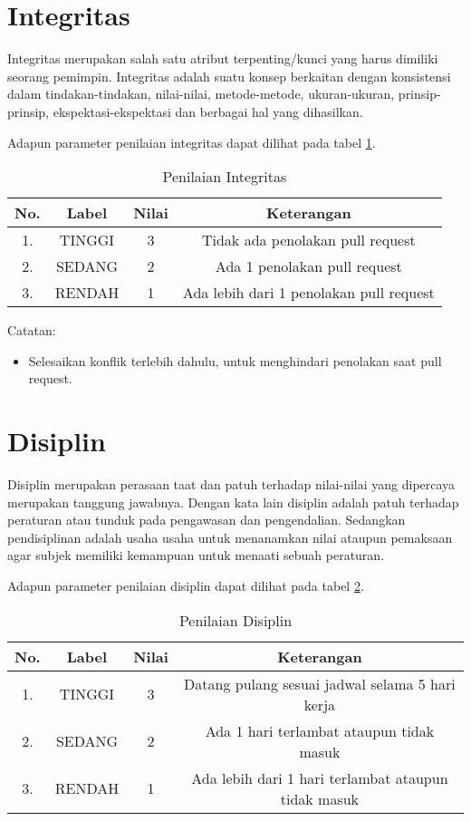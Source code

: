 \section{Integritas}
Integritas merupakan salah satu atribut terpenting/kunci yang harus dimiliki seorang pemimpin. Integritas adalah suatu konsep berkaitan dengan konsistensi dalam tindakan-tindakan, nilai-nilai, metode-metode, ukuran-ukuran, prinsip-prinsip, ekspektasi-ekspektasi dan berbagai hal yang dihasilkan.

Adapun parameter penilaian integritas dapat dilihat pada tabel \ref{tab:nilaiintegritas}.

\begin{table}[h]
\caption{Penilaian Integritas}
\centering
\begin{tabular}{|c|c|c|c|}
\hline
\textbf{No.}&\textbf{Label}&\textbf{Nilai}&\textbf{Keterangan}\\
\hline
1.&TINGGI&3&Tidak ada penolakan pull request\\
\hline
2.&SEDANG&2&Ada 1 penolakan pull request\\
\hline
3.&RENDAH&1&Ada lebih dari 1 penolakan pull request\\
\hline
\end{tabular}
\label{tab:nilaiintegritas}
\end{table}

Catatan:
\begin{itemize}
\item Selesaikan konflik terlebih dahulu, untuk menghindari penolakan saat pull request.
\end{itemize}

\section{Disiplin}
Disiplin merupakan perasaan taat dan patuh terhadap nilai-nilai yang dipercaya merupakan tanggung jawabnya. Dengan kata lain disiplin adalah patuh terhadap peraturan atau tunduk pada pengawasan dan pengendalian. Sedangkan pendisiplinan adalah usaha usaha untuk menanamkan nilai ataupun pemaksaan agar subjek memiliki kemampuan untuk menaati sebuah peraturan.

Adapun parameter penilaian disiplin dapat dilihat pada tabel \ref{tab:nilaidisiplin}.

\begin{table}[h]
\caption{Penilaian Disiplin}
\centering
\begin{tabular}{|c|c|c|c|}
\hline
\textbf{No.}&\textbf{Label}&\textbf{Nilai}&\textbf{Keterangan}\\
\hline
1.&TINGGI&3&Datang pulang sesuai jadwal selama 5 hari kerja\\
\hline
2.&SEDANG&2&Ada 1 hari terlambat ataupun tidak masuk\\
\hline
3.&RENDAH&1&Ada lebih dari 1 hari terlambat ataupun tidak masuk\\
\hline
\end{tabular}
\label{tab:nilaidisiplin}
\end{table}

